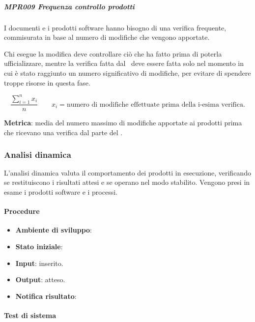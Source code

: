 			\subparagraph{MPR009 Frequenza controllo prodotti}
			I documenti e i prodotti software hanno bisogno di una verifica frequente, commisurata in base al numero di modifiche che vengono apportate.
		
			Chi esegue la modifica deve controllare ciò che ha fatto prima di poterla ufficializzare, mentre la verifica fatta dal \Ver\ deve essere
			fatta solo nel momento in cui è stato raggiunto un numero significativo di modifiche, per evitare di spendere troppe risorse in questa fase.
		
			\[\dfrac{\sum_{i=1}^{n} x_i}{n} \qquad x_i=\text{numero di modifiche effettuate prima della i-esima verifica.}\]
		
			\textbf{Metrica}: media del numero massimo di modifiche apportate ai prodotti prima che ricevano una verifica dal parte del \Ver.

		
		
		\subsubsection{Analisi dinamica} %
		L'analisi dinamica valuta il comportamento dei prodotti in esecuzione, verificando se restituiscono i risultati attesi e se operano nel modo stabilito.
		Vengono presi in esame i prodotti software e i processi.
		
			\paragraph{Procedure} %
			\begin{itemize}
				\item \textbf{Ambiente di sviluppo}:
				\item \textbf{Stato iniziale}:
				\item \textbf{Input}: inserito.
				\item \textbf{Output}: atteso.
				\item \textbf{Notifica risultato}:
			\end{itemize}
		
			
			\paragraph{Test di sistema} %
			
